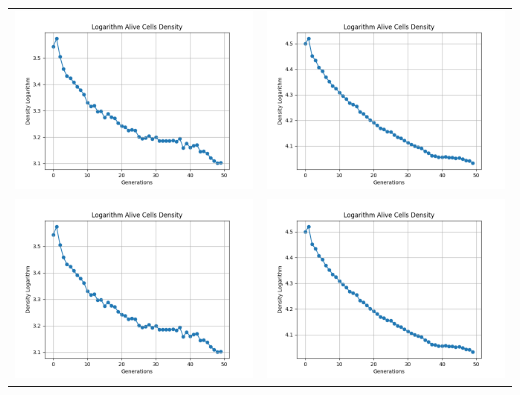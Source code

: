 \documentclass[]{article}
\begin{document}
			\begin{table}[!h]
				\centering
				\begin{tabular}{c c}
					\includegraphics[width=9cm]{Imagenes/Densidad_logaritmo_100x100_50Gen.png} & \includegraphics[width=9cm]{Imagenes/Densidad_logaritmo_300x300_50Gen.png} \\
					\includegraphics[width=9cm]{Imagenes/Densidad_logaritmo_100x100_50Gen.png} & \includegraphics[width=9cm]{Imagenes/Densidad_logaritmo_300x300_50Gen.png} 

\end{tabular}
\end{table}
\end{document}
